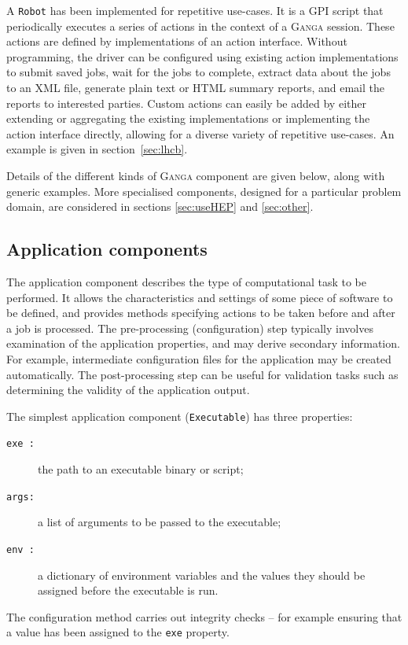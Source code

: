 \documentclass{elsart}
\def\ganga {\textsc{Ganga}\xspace}
\def\GPI{GPI\xspace}
\newcommand{\code}[1]{\texttt{#1}}
\begin{document}
\begin{linenumbers}
A \code{Robot} has been implemented for repetitive use-cases. It is a \GPI
script that periodically executes a series of
actions in the context of a \ganga session.  These actions are defined by
implementations of an action interface.  Without programming, the driver can be
configured using existing action implementations to submit saved jobs, wait
for the jobs to complete, extract data about the jobs to an XML file, generate
plain text or HTML summary reports, and email the reports to interested
parties. Custom actions can easily be added by either extending or aggregating
the existing implementations or implementing the action interface directly,
allowing for a diverse variety of repetitive use-cases. An example is given
in section~\ref{sec:lhcb}.

Details of the different kinds of \ganga component are given below, along with
generic examples. More specialised components, designed for a particular
problem domain, are considered in sections \ref{sec:useHEP} and \ref{sec:other}.

\subsection{Application components}

The application component describes the type of computational task to be
performed.  It allows the characteristics and settings of some
piece of software to be defined, and provides methods specifying
actions to be taken before and after a job is processed.  The
pre-processing (configuration) step typically involves examination of
the application properties, and may derive secondary
information. For example, intermediate configuration files for the
application may be created automatically. The post-processing step can
be useful for validation tasks such as determining the validity
of the application output.

The simplest application component (\texttt{Executable}) has three properties:
\begin{description}
\item[\code{exe :}] the path to an executable binary or script;
\item[\code{args:}] a list of arguments to be passed to the executable;
\item[\code{env :}] a dictionary of environment variables and the values they
  should be assigned before the executable is run.
\end{description}
The configuration method carries out integrity checks -- for example
ensuring that a value has been assigned to the \code{exe} property.


\end{linenumbers}
\end{document}
